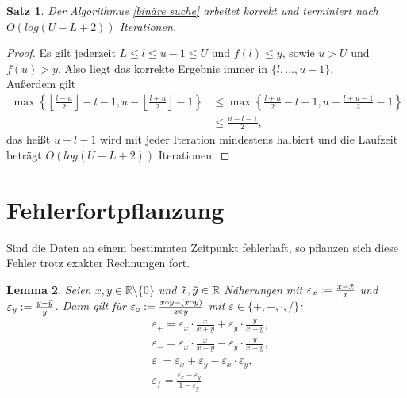 \documentclass[12pt]{article}
\newcommand{\R}{\mathbb{R}} %
\newtheorem{satz}{Satz}[section]
\newtheorem{lemma}[satz]{Lemma}
\begin{document}
\begin{satz}
    Der Algorithmus \ref{binäre suche} arbeitet korrekt und terminiert nach $O(log(U-L+2))$ Iterationen.  
\end{satz}

\begin{proof}
    Es gilt jederzeit $L \leq l \leq u-1 \leq U$ und $f(l) \leq y$, sowie $u>U$ und $f(u)>y$. Also liegt das korrekte Ergebnis immer in $\{l,...,u-1\}$. \\ 
    Außerdem gilt 
    \begin{align*}
        \max\left\{ \left\lfloor \frac{l+u}{2}\right\rfloor -l-1, u- \left\lfloor \frac{l+u}{2} \right\rfloor -1 \right\} &\leq \max \left\{ \frac{l+u}{2}-l-1, u- \frac{l+u-1}{2}-1 \right\} \\
        &\leq \frac{u-l-1}{2},
    \end{align*}
    das heißt $u-l-1$ wird mit jeder Iteration mindestens halbiert und die Laufzeit beträgt $O(log(U-L+2))$ Iterationen.
\end{proof}

\newpage
\section{Fehlerfortpflanzung}
Sind die Daten an einem bestimmten Zeitpunkt fehlerhaft, so pflanzen sich diese Fehler trotz exakter Rechnungen fort. \\ 
\begin{lemma}
    Seien $x,y \in \R\setminus\{0\}$ und $\Tilde{x}, \Tilde{y} \in \R$ Näherungen mit $\varepsilon_x:= \frac{x- \Tilde{x}}{x}$ und $\varepsilon_y:= \frac{y- \Tilde{y}}{y}$. Dann gilt für $\varepsilon_\circ := \frac{x \circ y- (\Tilde{x} \circ \Tilde{y})}{x \circ y}$ mit $\varepsilon \in \{+,-,\cdot,/\}$: 
    \begin{align*}
        &\varepsilon_+= \varepsilon_x \cdot \frac{x}{x+y}+ \varepsilon_y \cdot \frac{y}{x+y}, \\
        &\varepsilon_-= \varepsilon_x \cdot \frac{x}{x-y}- \varepsilon_y \cdot \frac{y}{x-y}, \\
        &\varepsilon_{\cdot}= \varepsilon_x + \varepsilon_y- \varepsilon_x \cdot \varepsilon_y, \\
        &\varepsilon_/ = \frac{\varepsilon_x- \varepsilon_y}{1- \varepsilon_y}
    \end{align*}
\end{lemma}
\end{document}
